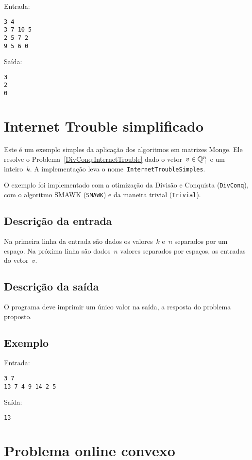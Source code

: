 Entrada:
\begin{verbatim}
3 4
3 7 10 5
2 5 7 2
9 5 6 0
\end{verbatim}
Saída:
\begin{verbatim}
3
2
0
\end{verbatim}

\section{Internet Trouble simplificado} \label{InternetTroubleSimples}

Este é um exemplo simples da aplicação dos algoritmos em matrizes Monge. Ele resolve o Problema~\ref{DivConq:InternetTrouble} dado o vetor~$v \in \mathbb{Q}^{n}_+$ e um inteiro~$k$. A implementação leva o nome~\texttt{InternetTroubleSimples}.

O exemplo foi implementado com a otimização da Divisão e Conquista (\texttt{DivConq}), com o algoritmo SMAWK (\texttt{SMAWK}) e da maneira trivial (\texttt{Trivial}).

\subsection{Descrição da entrada}

Na primeira linha da entrada são dados os valores~$k$ e~$n$ separados por um espaço. Na próxima linha são dados~$n$ valores separados por espaços, as entradas do vetor~$v$.

\subsection{Descrição da saída}

O programa deve imprimir um único valor na saída, a resposta do problema proposto.

\subsection{Exemplo}

Entrada:
\begin{verbatim}
3 7
13 7 4 9 14 2 5
\end{verbatim}
Saída:
\begin{verbatim}
13
\end{verbatim}


\section{Problema online convexo} \label{ProblemaOnlineConvexo}

